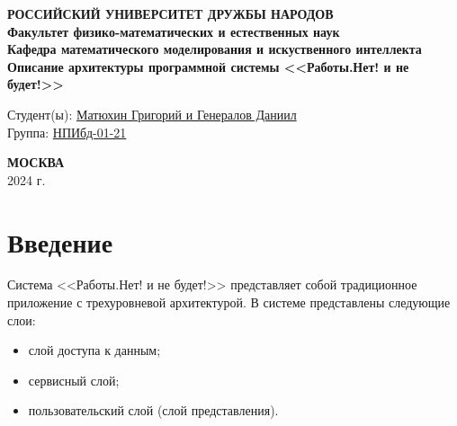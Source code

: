 \documentclass[a4page]{article}
\begin{document}

\begin{titlepage}

\begin{center}
\hfill \break
\textbf{
\large{РОССИЙСКИЙ УНИВЕРСИТЕТ ДРУЖБЫ НАРОДОВ}\\
\normalsize{Факультет физико-математических и естественных наук}\\ 
\normalsize{Кафедра математического моделирования и искуственного интеллекта}\\
}
\vspace*{\fill}
\Large{\textbf{Описание архитектуры программной системы <<Работы.Нет! и не будет!>>}}
\vspace*{\fill}

\end{center}
 
 \begin{flushright}
 Студент(ы): \underline{Матюхин Григорий и Генералов Даниил}\\ \vspace{0.5cm}
 Группа: \underline{НПИбд-01-21}
 \end{flushright}
 
 
\begin{center} \textbf{МОСКВА} \\ 2024 г. \end{center}
\thispagestyle{empty} %

\end{titlepage}

\newpage

\tableofcontents

\newpage

\section{Введение}

Система <<Работы.Нет! и не будет!>> представляет собой
традиционное приложение с трехуровневой архитектурой.
В системе представлены следующие слои:

\begin{itemize}
  \item слой доступа к данным;
  \item сервисный слой;
  \item пользовательский слой (слой представления).
\end{itemize}
\end{document}
